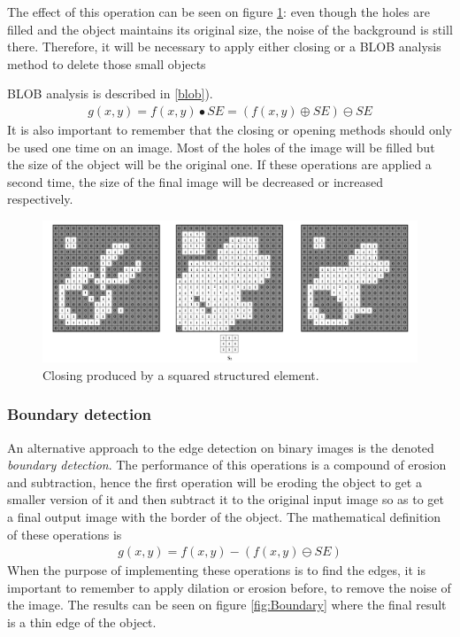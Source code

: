 The effect of this operation can be seen on figure \ref{fig:Closing}: even though the holes are filled and the object maintains its original size, the noise of the background is still there. Therefore, it will be necessary to apply either closing or a BLOB analysis method to delete those small objects {BLOB analysis is described in \ref{blob}).
\begin{equation}
\begin{aligned}
{g(x,y)}={f(x,y)}\bullet{SE}=({f(x,y)}\oplus{SE})\ominus{SE}
\label{Closing}
	\end{aligned}
\end{equation}
It is also important to remember that the closing or opening methods should only be used one time on an image. Most of the holes of the image will be filled but the size of the object will be the original one. If these operations are applied a second time, the size of the final image will be decreased or increased respectively.

\begin{figure}[htbp]
\centering
\includegraphics[width=1\textwidth]{Pictures/Theory/ClosingSq.png}
\caption{Closing produced by a squared structured element.}
\label{fig:Closing}
\end{figure}

\subsubsection{Boundary detection}
An alternative approach to the edge detection on binary images is the denoted \textit{boundary detection}. The performance of this operations is a compound of erosion and subtraction, hence the first operation will be eroding the object to get a smaller version of it and then subtract it to the original input image so as to get a final output image with the border of the object. The mathematical definition of these operations is
\begin{equation}
\begin{aligned}
{g(x,y)}={f(x,y)}-({f(x,y)}\ominus{SE})
\label{BoundDetec}
	\end{aligned}
\end{equation}
When the purpose of implementing these operations is to find the edges, it is important to remember to apply dilation or erosion before, to remove the noise of the image. The results can be seen on figure \ref{fig:Boundary} where the final result is a thin edge of the object.

}
